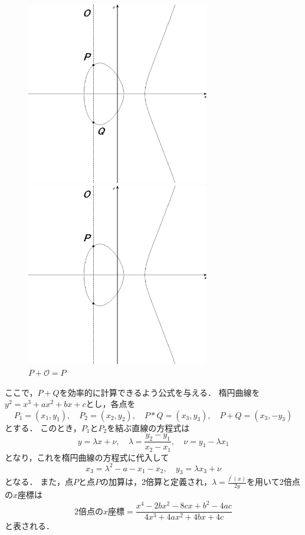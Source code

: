 \begin{figure}[htbp]
  \begin{minipage}{0.5\hsize}
    \begin{center}
      \includegraphics[width=80mm]{elliptic03.eps}
    \end{center}
    \caption{$P+Q=\mathcal{O}$}    \label{fig:elliptic03.eps}
  \end{minipage}
  \begin{minipage}{0.5\hsize}
    \begin{center}
      \includegraphics[width=80mm]{elliptic04.eps}
    \end{center}
    \caption{$P+\mathcal{O}=P$}
    \label{fig:elliptic04.eps}
  \end{minipage}
\end{figure}
\par
ここで，$P+Q$を効率的に計算できるよう公式を与える．
楕円曲線を$y^2 = x^3 + ax ^2 + bx +c$とし，各点を
\[
P _1 = (x _1, y _1), \quad P _2 = (x _2, y _2), \quad P*Q = (x _3, y _3), \quad P+Q = (x _3, - y _3)
\]
とする．
このとき，$P _1$と$P _2$を結ぶ直線の方程式は
\[
y = \lambda x + \nu, \quad \lambda = \frac{y _2 - y _1}{x _2 - x _1}, \quad \nu = y _1 - \lambda x _1 
\]
となり，これを楕円曲線の方程式に代入して
\[
x _3 = \lambda ^2 - a - x _1 - x _2, \quad y _3 = \lambda x _3 + \nu
\]
となる．
また，点$P$と点$P$の加算は，2倍算と定義され，$\lambda = \frac{f^{'}(x)}{2y}$を用いて2倍点の$x$座標は
\[
2倍点のx座標 = \frac{x^4 - 2bx^2 - 8cx + b^2 - 4ac}{4x^3 + 4ax^2 + 4bx + 4c}
\]
と表される．\\
\par

